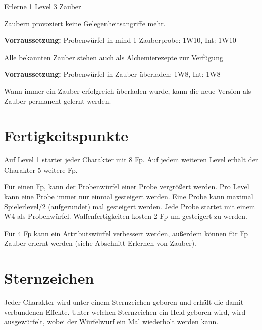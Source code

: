 \documentclass[../../Heldenanleitung2]{subfiles}
\begin{document}
\begin{multicols}{2}
\begin{tcolorbox}[title={Zauberkundig III},colbacktitle=blue, coltitle=white]
   Erlerne 1 Level 3 Zauber
\end{tcolorbox}

\begin{tcolorbox}[title={Kriegszauberer},colbacktitle=blue, coltitle=white]
	Zaubern provoziert keine Gelegenheitsangriffe mehr.
\end{tcolorbox}

\begin{tcolorbox}[title={Magischer Alchemist},colbacktitle=blue, coltitle=white]
	\textbf{Vorraussetzung:} Probenwürfel in mind 1 Zauberprobe: 1W10, Int: 1W10
	\vspace{0.2cm}
	
	Alle bekannten Zauber stehen auch als Alchemierezepte zur Verfügung
\end{tcolorbox}

\begin{tcolorbox}[title={Experimentator},colbacktitle=blue, coltitle=white]
	\textbf{Vorraussetzung:} Probenwürfel in Zauber überladen: 1W8, Int: 1W8
	\vspace{0.2cm}
	
	Wann immer ein Zauber erfolgreich überladen wurde, kann die neue Version als Zauber permanent gelernt werden.
\end{tcolorbox}

\end{multicols}

\section{Fertigkeitspunkte}
Auf Level 1 startet jeder Charakter mit 8 Fp. Auf jedem weiteren Level erhält der Charakter 5 weitere Fp.

Für einen Fp, kann der Probenwürfel einer Probe vergrößert werden. Pro Level kann eine Probe immer nur einmal gesteigert werden. Eine Probe kann maximal Spielerlevel/2 (aufgerundet) mal gesteigert werden. Jede Probe startet mit einem W4 als Probenwürfel. Waffenfertigkeiten kosten 2 Fp um gesteigert zu werden.

Für 4 Fp kann ein Attributswürfel verbessert werden, außerdem können für Fp Zauber erlernt werden (siehe Abschnitt Erlernen von Zauber).

\section{Sternzeichen}
Jeder Charakter wird unter einem Sternzeichen geboren und erhält die damit verbundenen Effekte. Unter welchen Sternzeichen ein Held geboren wird, wird ausgewürfelt, wobei der Würfelwurf ein Mal wiederholt werden kann.
\end{document}
